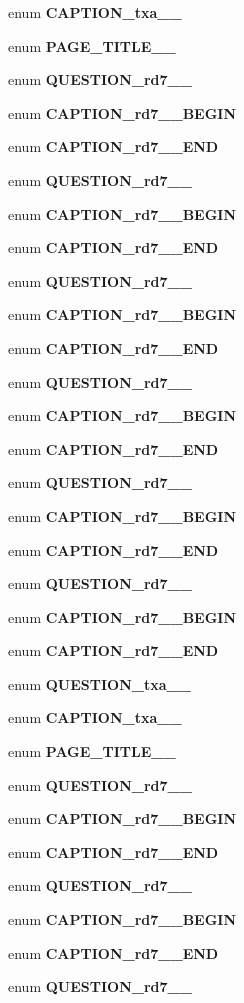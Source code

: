 \begin{CompactItemize}
\item 
enum {\bf CAPTION\_\-txa\_\_\-} 
\item 
enum {\bf PAGE\_\-TITLE\_\_\-} 
\item 
enum {\bf QUESTION\_\-rd7\_\_\-} 
\item 
enum {\bf CAPTION\_\-rd7\_\_\-BEGIN} 
\item 
enum {\bf CAPTION\_\-rd7\_\_\-END} 
\item 
enum {\bf QUESTION\_\-rd7\_\_\-} 
\item 
enum {\bf CAPTION\_\-rd7\_\_\-BEGIN} 
\item 
enum {\bf CAPTION\_\-rd7\_\_\-END} 
\item 
enum {\bf QUESTION\_\-rd7\_\_\-} 
\item 
enum {\bf CAPTION\_\-rd7\_\_\-BEGIN} 
\item 
enum {\bf CAPTION\_\-rd7\_\_\-END} 
\item 
enum {\bf QUESTION\_\-rd7\_\_\-} 
\item 
enum {\bf CAPTION\_\-rd7\_\_\-BEGIN} 
\item 
enum {\bf CAPTION\_\-rd7\_\_\-END} 
\item 
enum {\bf QUESTION\_\-rd7\_\_\-} 
\item 
enum {\bf CAPTION\_\-rd7\_\_\-BEGIN} 
\item 
enum {\bf CAPTION\_\-rd7\_\_\-END} 
\item 
enum {\bf QUESTION\_\-rd7\_\_\-} 
\item 
enum {\bf CAPTION\_\-rd7\_\_\-BEGIN} 
\item 
enum {\bf CAPTION\_\-rd7\_\_\-END} 
\item 
enum {\bf QUESTION\_\-txa\_\_\-} 
\item 
enum {\bf CAPTION\_\-txa\_\_\-} 
\item 
enum {\bf PAGE\_\-TITLE\_\_\-} 
\item 
enum {\bf QUESTION\_\-rd7\_\_\-} 
\item 
enum {\bf CAPTION\_\-rd7\_\_\-BEGIN} 
\item 
enum {\bf CAPTION\_\-rd7\_\_\-END} 
\item 
enum {\bf QUESTION\_\-rd7\_\_\-} 
\item 
enum {\bf CAPTION\_\-rd7\_\_\-BEGIN} 
\item 
enum {\bf CAPTION\_\-rd7\_\_\-END} 
\item 
enum {\bf QUESTION\_\-rd7\_\_\-} 
\item 

\end{CompactItemize}
